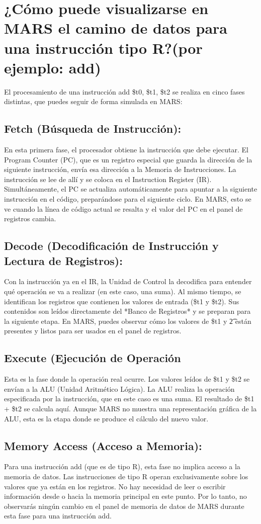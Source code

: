\documentclass{article}
\begin{document}
\section{¿Cómo puede visualizarse en MARS el camino de datos para una instrucción tipo R?(por ejemplo: add)}
El procesamiento de una instrucción add \$t0, \$t1, \$t2 se realiza en cinco fases distintas, que puedes seguir de forma simulada en MARS:
\subsection{Fetch (Búsqueda de Instrucción): }
En esta primera fase, el procesador obtiene la instrucción que debe ejecutar. El Program Counter (PC), que es un registro especial que guarda la dirección de la siguiente instrucción, envía esa dirección a la Memoria de Instrucciones. La instrucción se lee de allí y se coloca en el Instruction Register (IR). Simultáneamente, el PC se actualiza automáticamente para apuntar a la siguiente instrucción en el código, preparándose para el siguiente ciclo. En MARS, esto se ve cuando la línea de código actual se resalta y el valor del PC en el panel de registros cambia.
\subsection{Decode (Decodificación de Instrucción y Lectura de Registros): }
Con la instrucción ya en el IR, la Unidad de Control la decodifica para entender qué operación se va a realizar (en este caso, una suma). Al mismo tiempo, se identifican los registros que contienen los valores de entrada (\$t1 y \$t2). Sus contenidos son leídos directamente del *Banco de Registros* y se preparan para la siguiente etapa. En MARS, puedes observar cómo los valores de \$t1 y \t2 están presentes y listos para ser usados en el panel de registros.
\subsection{Execute (Ejecución de Operación}
Esta es la fase donde la operación real ocurre. Los valores leídos de \$t1 y \$t2 se envían a la ALU (Unidad Aritmético Lógica). La ALU realiza la operación especificada por la instrucción, que en este caso es una suma. El resultado de \$t1 + \$t2 se calcula aquí. Aunque MARS no muestra una representación gráfica de la ALU, esta es la etapa donde se produce el cálculo del nuevo valor.
\subsection{Memory Access (Acceso a Memoria): }
Para una instrucción add (que es de tipo R), esta fase no implica acceso a la memoria de datos. Las instrucciones de tipo R operan exclusivamente sobre los valores que ya están en los registros. No hay necesidad de leer o escribir información desde o hacia la memoria principal en este punto. Por lo tanto, no observarás ningún cambio en el panel de memoria de datos de MARS durante esta fase para una instrucción add.
\end{document}

